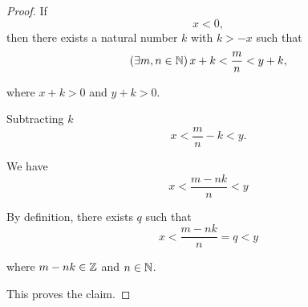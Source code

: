 \begin{proof}
    If
    \begin{equation*}
        x < 0, 
    \end{equation*}
    then there exists a natural number $k$ with $k > -x$ such that 
    \begin{equation*}
        \left(\exists m, n \in \mathbb{N}\right) x + k < \frac{m }{n} < y + k, 
    \end{equation*}

    where $x + k > 0$ and $y + k > 0$. 

    Subtracting $k$ 
    \begin{equation*}
        x < \frac{m }{n} - k < y. 
    \end{equation*}

    We have 
    \begin{equation*}
        x < \frac{m - nk}{n} < y 
    \end{equation*}
    
    By definition, there exists $q$ such that 
    \begin{equation*}
        x < \frac{m - nk}{n} = q < y 
    \end{equation*}

    where $m - nk \in \mathbb{Z}$ and $n \in \mathbb{N}$.
    
    This proves the claim. 
\end{proof}